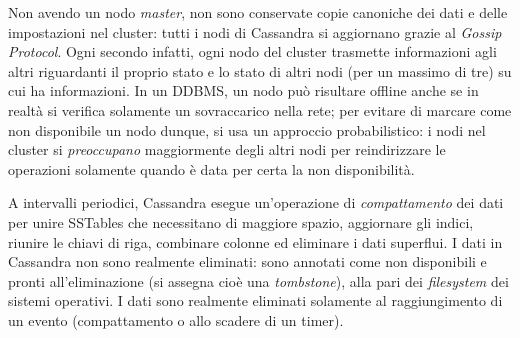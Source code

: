 \documentclass[a4page, 11pt]{article}
\begin{document}
Non avendo un nodo \textit{master}, non sono conservate copie canoniche dei dati e delle impostazioni nel cluster: tutti i nodi di Cassandra si aggiornano grazie al \textit{Gossip Protocol}.
Ogni secondo infatti, ogni nodo del cluster trasmette informazioni agli altri riguardanti il proprio stato e lo stato di altri nodi (per un massimo di tre) su cui ha informazioni.
In un DDBMS, un nodo può risultare offline anche se in realtà si verifica solamente un sovraccarico nella rete; per evitare di marcare come non disponibile un nodo dunque, si usa un approccio probabilistico: i nodi nel cluster si \textit{preoccupano} maggiormente degli altri nodi per reindirizzare le operazioni solamente quando è data per certa la non disponibilità.

A intervalli periodici, Cassandra esegue un'operazione di \textit{compattamento} dei dati per unire SSTables che necessitano di maggiore spazio, aggiornare gli indici, riunire le chiavi di riga, combinare colonne ed eliminare i dati superflui.
I dati in Cassandra non sono realmente eliminati: sono annotati come non disponibili e pronti all'eliminazione (si assegna cioè una \textit{tombstone}), alla pari dei \textit{filesystem} dei sistemi operativi.
I dati sono realmente eliminati solamente al raggiungimento di un evento (compattamento o allo scadere di un timer).


\newpage
\printbibliography[title={Letture di approfondimento}]
\end{document}
